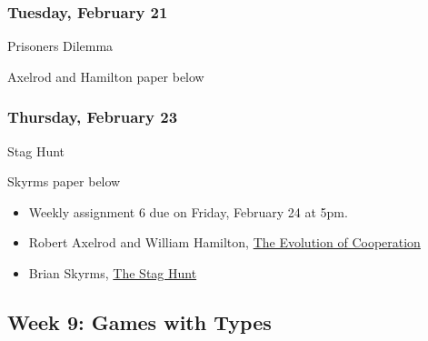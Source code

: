 \documentclass[
]{article}
\providecommand{\tightlist}{%
  \setlength{\itemsep}{0pt}\setlength{\parskip}{0pt}}
\begin{document}
\begin{multicols}{2}

\hypertarget{tuesday-february-21}{%
\subsubsection{Tuesday, February 21}\label{tuesday-february-21}}

\begin{description}
\tightlist
\item[Topic]
Prisoners Dilemma
\item[Reading]
Axelrod and Hamilton paper below
\end{description}

\hypertarget{thursday-february-23}{%
\subsubsection{Thursday, February 23}\label{thursday-february-23}}

\begin{description}
\tightlist
\item[Topic]
Stag Hunt
\item[Reading]
Skyrms paper below
\end{description}

\end{multicols}

\begin{itemize}
\tightlist
\item
  Weekly assignment 6 due on Friday, February 24 at 5pm.
\item
  Robert Axelrod and William Hamilton,
  \href{http://www-personal.umich.edu/~axe/research/Axelrod\%20and\%20Hamilton\%20EC\%201981.pdf}{The
  Evolution of Cooperation}
\item
  Brian Skyrms, \href{https://www.jstor.org/stable/3218711}{The Stag
  Hunt}
\end{itemize}

\hypertarget{week-9-games-with-types}{%
\subsection{Week 9: Games with Types}\label{week-9-games-with-types}}
\end{document}
